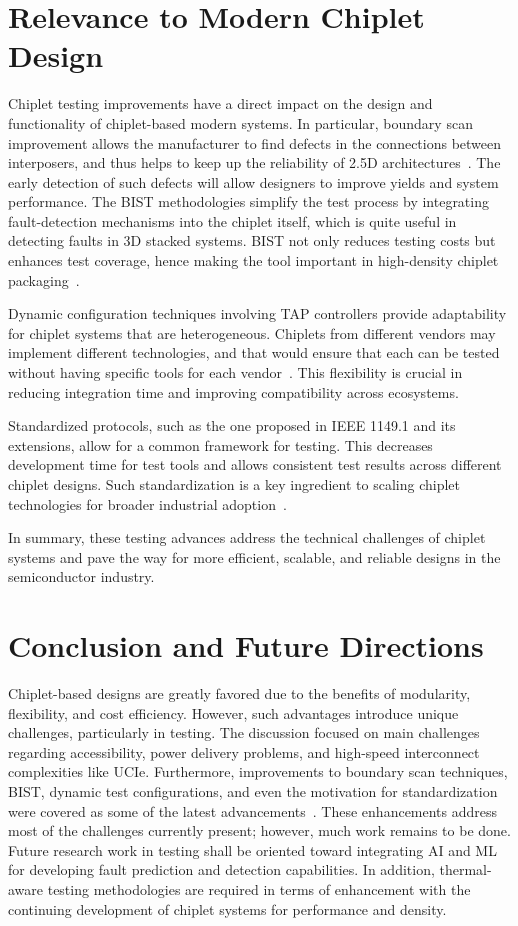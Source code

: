 \documentclass[acmtog, 12pt]{acmart}
\begin{document}
\section*{Relevance to Modern Chiplet Design}

Chiplet testing improvements have a direct impact on the design and functionality of chiplet-based modern systems. In particular, boundary scan improvement allows the manufacturer to find defects in the connections between interposers, and thus helps to keep up the reliability of 2.5D architectures~\cite{10365967}. The early detection of such defects will allow designers to improve yields and system performance.
The BIST methodologies simplify the test process by integrating fault-detection mechanisms into the chiplet itself, which is quite useful in detecting faults in 3D stacked systems. BIST not only reduces testing costs but enhances test coverage, hence making the tool important in high-density chiplet packaging~\cite{10766679}.

Dynamic configuration techniques involving TAP controllers provide adaptability for chiplet systems that are heterogeneous. Chiplets from different vendors may implement different technologies, and that would ensure that each can be tested without having specific tools for each vendor~\cite{9824550}. This flexibility is crucial in reducing integration time and improving compatibility across ecosystems.

Standardized protocols, such as the one proposed in IEEE 1149.1 and its extensions, allow for a common framework for testing. This decreases development time for test tools and allows consistent test results across different chiplet designs. Such standardization is a key ingredient to scaling chiplet technologies for broader industrial adoption~\cite{6515989}.

In summary, these testing advances address the technical challenges of chiplet systems and pave the way for more efficient, scalable, and reliable designs in the semiconductor industry.



\section*{Conclusion and Future Directions}
Chiplet-based designs are greatly favored due to the benefits of modularity, flexibility, and cost efficiency. However, such advantages introduce unique challenges, particularly in testing. The discussion focused on main challenges regarding accessibility, power delivery problems, and high-speed interconnect complexities like UCIe. Furthermore, improvements to boundary scan techniques, BIST, dynamic test configurations, and even the motivation for standardization were covered as some of the latest advancements~\cite{10365967, 10766679, 9824550, 6515989}.
These enhancements address most of the challenges currently present; however, much work remains to be done. Future research work in testing shall be oriented toward integrating AI and ML for developing fault prediction and detection capabilities. In addition, thermal-aware testing methodologies are required in terms of enhancement with the continuing development of chiplet systems for performance and density.
\end{document}
